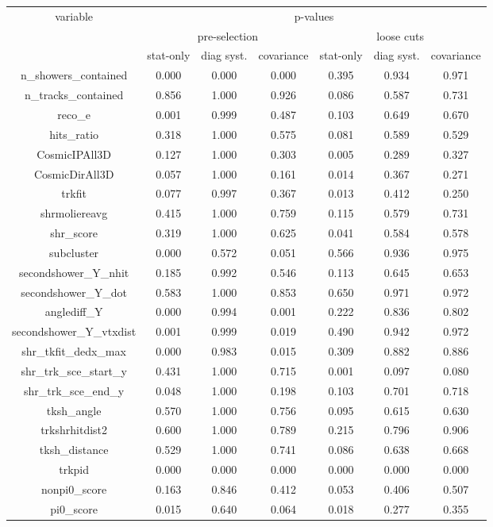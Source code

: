 \begin{table}[H]
\centering
\setlength{\tabcolsep}{10pt}
\renewcommand{\arraystretch}{1.25}
\begin{tabular}{| c | c | c | c | c | c | c |} 
 \hline
\multirow{3}{*}{variable} & \multicolumn{6}{c|}{p-values} \\
\cline{2-7} & \multicolumn{3}{c|}{pre-selection} & \multicolumn{3}{c|}{loose cuts}  \\
\cline{2-7} & stat-only & diag syst. & covariance & stat-only & diag syst. & covariance \\ \hline
n\_showers\_contained & 0.000 & 0.000 & 0.000 & 0.395 & 0.934 & 0.971 \\ \hline
n\_tracks\_contained & 0.856 & 1.000 & 0.926 & 0.086 & 0.587 & 0.731 \\ \hline
reco\_e & 0.001 & 0.999 & 0.487 & 0.103 & 0.649 & 0.670 \\ \hline
hits\_ratio & 0.318 & 1.000 & 0.575 & 0.081 & 0.589 & 0.529 \\ \hline
CosmicIPAll3D & 0.127 & 1.000 & 0.303 & 0.005 & 0.289 & 0.327 \\ \hline
CosmicDirAll3D & 0.057 & 1.000 & 0.161 & 0.014 & 0.367 & 0.271 \\ \hline
trkfit & 0.077 & 0.997 & 0.367 & 0.013 & 0.412 & 0.250 \\ \hline
shrmoliereavg & 0.415 & 1.000 & 0.759 & 0.115 & 0.579 & 0.731 \\ \hline
shr\_score & 0.319 & 1.000 & 0.625 & 0.041 & 0.584 & 0.578 \\ \hline
subcluster & 0.000 & 0.572 & 0.051 & 0.566 & 0.936 & 0.975 \\ \hline
secondshower\_Y\_nhit & 0.185 & 0.992 & 0.546 & 0.113 & 0.645 & 0.653 \\ \hline
secondshower\_Y\_dot & 0.583 & 1.000 & 0.853 & 0.650 & 0.971 & 0.972 \\ \hline
anglediff\_Y & 0.000 & 0.994 & 0.001 & 0.222 & 0.836 & 0.802 \\ \hline
secondshower\_Y\_vtxdist & 0.001 & 0.999 & 0.019 & 0.490 & 0.942 & 0.972 \\ \hline
shr\_tkfit\_dedx\_max & 0.000 & 0.983 & 0.015 & 0.309 & 0.882 & 0.886 \\ \hline
shr\_trk\_sce\_start\_y & 0.431 & 1.000 & 0.715 & 0.001 & 0.097 & 0.080 \\ \hline
shr\_trk\_sce\_end\_y & 0.048 & 1.000 & 0.198 & 0.103 & 0.701 & 0.718 \\ \hline
tksh\_angle & 0.570 & 1.000 & 0.756 & 0.095 & 0.615 & 0.630 \\ \hline
trkshrhitdist2 & 0.600 & 1.000 & 0.789 & 0.215 & 0.796 & 0.906 \\ \hline
tksh\_distance & 0.529 & 1.000 & 0.741 & 0.086 & 0.638 & 0.668 \\ \hline
trkpid & 0.000 & 0.000 & 0.000 & 0.000 & 0.000 & 0.000 \\ \hline
nonpi0\_score & 0.163 & 0.846 & 0.412 & 0.053 & 0.406 & 0.507 \\ \hline
pi0\_score & 0.015 & 0.640 & 0.064 & 0.018 & 0.277 & 0.355 \\ \hline


\end{tabular}
\end{table}
